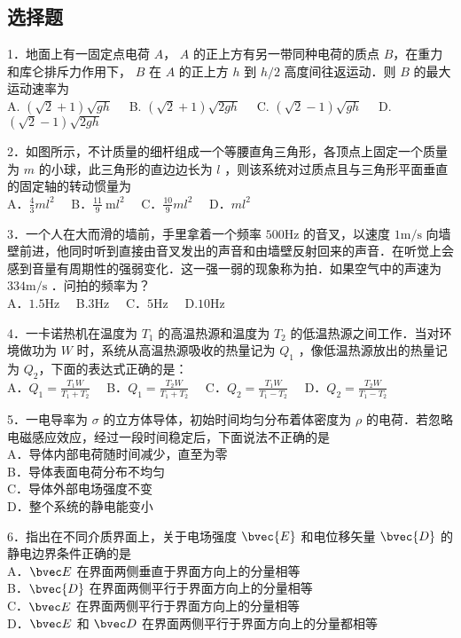 
\subsection{选择题}
1．地面上有一固定点电荷 $A$， $A$ 的正上方有另一带同种电荷的质点 $B$，在重力和库仑排斥力作用下， $B$ 在 $A$ 的正上方 $h$ 到 $h/2$ 高度间往返运动．则 $B$ 的最大运动速率为\\
A. $(\sqrt{2}+1) \sqrt{g h}\quad$
B. $(\sqrt{2}+1) \sqrt{2 g h}\quad$
C. $(\sqrt{2}-1) \sqrt{g h}\quad$
D. $(\sqrt{2}-1) \sqrt{2 g h}$

2．如图所示，不计质量的细杆组成一个等腰直角三角形，各顶点上固定一个质量为 $m$ 的小球，此三角形的直边边长为 $l$ ，则该系统对过质点且与三角形平面垂直的固定轴的转动惯量为\\
A．$\frac{4}{3} m l^{2}\quad$
B．$\frac{11}{9} \mathrm{~m} l^{2}\quad$
C．$\frac{10}{9} m l^{2}\quad$
D．$ml^{2}$

3．一个人在大而滑的墙前，手里拿着一个频率 $500\mathrm{Hz}$ 的音叉，以速度 $1\mathrm{m/s}$ 向墙壁前进，他同时听到直接由音叉发出的声音和由墙壁反射回来的声音．在听觉上会感到音量有周期性的强弱变化．这一强一弱的现象称为拍．如果空气中的声速为 $334\mathrm{m/s}$ ．问拍的频率为？\\
A．$1.5\mathrm{Hz}\quad$ B.$3\mathrm{Hz}\quad$ C．$5\mathrm{Hz}\quad$ D.$10\mathrm{Hz}$

4．一卡诺热机在温度为 $T_1$ 的高温热源和温度为 $T_2$ 的低温热源之间工作．当对环境做功为 $W$ 时，系统从高温热源吸收的热量记为 $Q_1$ ，像低温热源放出的热量记为 $Q_2$，下面的表达式正确的是：\\

A．$Q_1=\frac{T_1W}{T_1+T_2}\quad$ B．$Q_1=\frac{T_2W}{T_1+T_2}\quad$ C．$Q_2=\frac{T_1W}{T_1-T_2}\quad$ D．$Q_2=\frac{T_2W}{T_1-T_2}$

5．一电导率为 $\sigma$ 的立方体导体，初始时间均匀分布着体密度为 $\rho$ 的电荷．若忽略电磁感应效应，经过一段时间稳定后，下面说法不正确的是\\
A．导体内部电荷随时间减少，直至为零\\
B．导体表面电荷分布不均匀\\
C．导体外部电场强度不变\\
D．整个系统的静电能变小

6．指出在不同介质界面上，关于电场强度 $\bvec{E}$ 和电位移矢量 $\bvec{D}$ 的静电边界条件正确的是\\
A．$\bvec E$ 在界面两侧垂直于界面方向上的分量相等\\
B．$\bvec{D}$ 在界面两侧平行于界面方向上的分量相等\\
C．$\bvec E$ 在界面两侧平行于界面方向上的分量相等\\
D．$\bvec E$ 和 $\bvec D$ 在界面两侧平行于界面方向上的分量都相等

